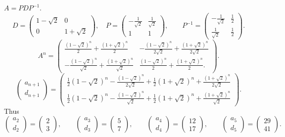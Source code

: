 \documentclass{article}
\theoremstyle{definition}
\begin{document}
$A=PDP^{-1}$.
\[
D=\begin{pmatrix}1-\sqrt{2}&0\\0&1+\sqrt{2}\end{pmatrix},
\quad 
P=\begin{pmatrix}-\frac{1}{\sqrt{2}}&\frac{1}{\sqrt{2}}\\
1&1\end{pmatrix},
\qquad 
P^{-1} = \begin{pmatrix}-\frac{1}{\sqrt{2}}&\frac{1}{2}\\
\frac{1}{\sqrt{2}}&\frac{1}{2}
\end{pmatrix}.
\]
\[
A^n = \begin{pmatrix}\frac{(1-\sqrt{2})^n}{2}+\frac{(1+\sqrt{2})^n}{2}&-\frac{(1-\sqrt{2})^n}{2\sqrt{2}}
+\frac{(1+\sqrt{2})^n}{2\sqrt{2}}\\
-\frac{(1-\sqrt{2})^n}{\sqrt{2}}+\frac{(1+\sqrt{2})^n}{\sqrt{2}}&
\frac{(1-\sqrt{2})^n}{2}+\frac{(1+\sqrt{2})^n}{2}.
\end{pmatrix}.
\]
\[
\begin{pmatrix}
a_{n+1}\\
d_{n+1}
\end{pmatrix}
=\begin{pmatrix}
\frac{1}{2} \left(1-\sqrt{2}\right)^n-\frac{\left(1-\sqrt{2}\right)^n}{2 \sqrt{2}}+\frac{1}{2} \left(1+\sqrt{2}\right)^n+\frac{\left(1+\sqrt{2}\right)^n}{2 \sqrt{2}}\\
\frac{1}{2} \left(1-\sqrt{2}\right)^n-\frac{\left(1-\sqrt{2}\right)^n}{\sqrt{2}}+\frac{1}{2} \left(1+\sqrt{2}\right)^n+\frac{\left(1+\sqrt{2}\right)^n}{\sqrt{2}}
\end{pmatrix}.
\]
Thus
\[
\begin{pmatrix}a_2\\d_2\end{pmatrix}
=\begin{pmatrix}
2\\3
\end{pmatrix},
\qquad
\begin{pmatrix}a_3\\d_3\end{pmatrix}
=\begin{pmatrix}
5\\7
\end{pmatrix},
\qquad
\begin{pmatrix}a_4\\d_4\end{pmatrix}
=\begin{pmatrix}
12\\17
\end{pmatrix},
\qquad
\begin{pmatrix}a_5\\d_5\end{pmatrix}
=\begin{pmatrix}
29\\41
\end{pmatrix}.
\]
\end{document}
